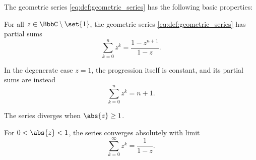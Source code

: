 \begin{proposition}\label{thm:def:geometric_series}
  The geometric series \eqref{eq:def:geometric_series} has the following basic properties:
  \begin{thmenum}
     For all \( z \in \BbbC \setminus \set{ 1 } \), the geometric series \eqref{eq:def:geometric_series} has partial sums
    \begin{equation}\label{eq:thm:def:geometric_series/finite_sum}
      \sum_{k=0}^n z^k = \frac {1 - z^{n+1}} {1 - z}.
    \end{equation}

     In the degenerate case \( z = 1 \), the progression itself is constant, and its partial sums are instead
    \begin{equation}\label{eq:thm:def:geometric_series/degenerate}
      \sum_{k=0}^n z^k = n + 1.
    \end{equation}

     The series diverges when \( \abs{z} \geq 1 \).

     For \( 0 < \abs{z} < 1 \), the series converges absolutely with limit
    \begin{equation}\label{eq:thm:def:geometric_series/series_sum_interior}
      \sum_{k=0}^\infty z^k = \frac 1 {1 - z}.
    \end{equation}
  \end{thmenum}
\end{proposition}

